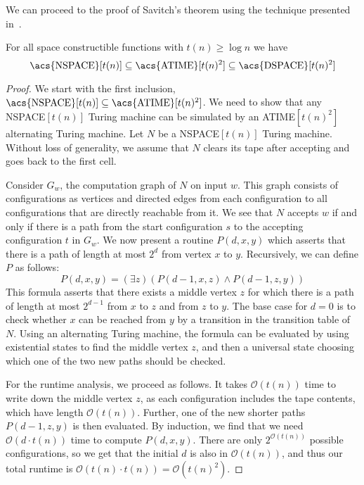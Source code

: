 We can proceed to the proof of Savitch's theorem using the technique presented in~\cite{descriptive-complexity}.
\begin{theorem}
    For all space constructible functions with $t(n) \geq \log n$ we have
    \[
        \text{\upshape \acs{NSPACE}}[t(n)] \subseteq \text{\upshape \acs{ATIME}}[t(n)^2] \subseteq \text{\upshape \acs{DSPACE}}[t(n)^2]
    \]
\end{theorem}

\begin{proof}
    We start with the first inclusion, $\text{\acs{NSPACE}}[t(n)] \subseteq \text{\acs{ATIME}}[t(n)^2]$.
    We need to show that any \acs{NSPACE}$[t(n)]$ Turing machine can be simulated by an \acs{ATIME}$[t(n)^2]$ alternating Turing machine.
    Let $N$ be a \acs{NSPACE}$[t(n)]$ Turing machine.
    Without loss of generality, we assume that $N$ clears its tape after accepting and goes back to the first cell.

    Consider $G_w$, the computation graph of $N$ on input $w$.
    This graph consists of configurations as vertices and directed edges from each configuration to all configurations that are directly reachable from it.
    We see that $N$ accepts $w$ if and only if there is a path from the start configuration $s$ to the accepting configuration $t$ in $G_w$.
    We now present a routine $P(d, x, y)$ which asserts that there is a path of length at most $2^{d}$ from vertex $x$ to $y$.
    Recursively, we can define $P$ as follows:
    \[
        P(d, x, y) = (\exists z)(P(d - 1, x, z) \land P(d - 1, z, y))
    \]
    This formula asserts that there exists a middle vertex $z$ for which there is a path of length at most $2^{d - 1}$ from $x$ to $z$ and from $z$ to $y$.
    The base case for $d = 0$ is to check whether $x$ can be reached from $y$ by a transition in the transition table of $N$.
    Using an alternating Turing machine, the formula can be evaluated by using existential states to find the middle vertex $z$, and then a universal state choosing which one of the two new paths should be checked.

    For the runtime analysis, we proceed as follows.
    It takes $\mathcal{O}(t(n))$ time to write down the middle vertex $z$, as each configuration includes the tape contents, which have length $\mathcal{O}(t(n))$.
    Further, one of the new shorter paths $P(d - 1, z, y)$ is then evaluated.
    By induction, we find that we need $\mathcal{O}(d\cdot t(n))$ time to compute $P(d, x, y)$.
    There are only $2^{\mathcal{O}(t(n))}$ possible configurations, so we get that the initial $d$ is also in $\mathcal{O}(t(n))$, and thus our total runtime is $\mathcal{O}(t(n)\cdot t(n)) = \mathcal{O}(t(n)^2)$.


\end{proof}
